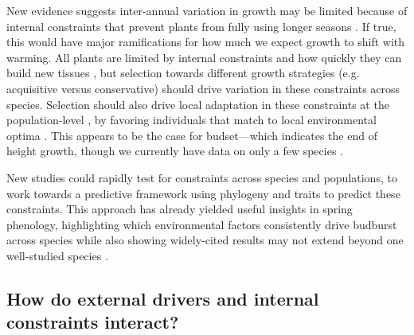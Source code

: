 \documentclass[11pt]{article}
\begin{document}
New evidence suggests inter-annual variation in growth may be limited because of internal constraints that prevent plants from fully using longer seasons \citep{zohner2023effect}. If true, this would have major ramifications for how much we expect growth to shift with warming. All plants are limited by internal constraints and how quickly they can build new tissues \citep{marchand2021timing,luo2024internal}, but selection towards different growth strategies (e.g. acquisitive versus conservative) should drive variation in these constraints across species. Selection should also drive local adaptation in these constraints at the population-level \citep{mckown2016impacts,soolanayakanahally2013timing}, by favoring individuals that match to local environmental optima \citep{Colautti:2010,mckown2014np}. This appears to be the case for budset---which indicates the end of height growth, though we currently have data on only a few species \citep{aitken2016,zeng2024weak}. 

New studies could rapidly test for constraints across species and populations, to work towards a predictive framework using phylogeny and traits to predict these constraints. This approach has already yielded useful insights in spring phenology, highlighting which environmental factors consistently drive budburst across species while also showing widely-cited results may not extend beyond one well-studied species \citep{morales2024phylogenetic}. %

\subsection*{How do external drivers and internal constraints interact?} %

\end{document}
